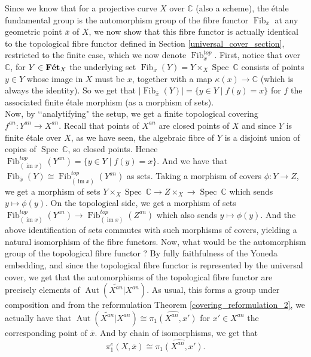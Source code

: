 \documentclass{article}
\theoremstyle{plain}
\theoremstyle{definition}
\DeclareMathOperator{\Fib}{Fib}
\DeclareMathOperator{\Aut}{Aut}
\DeclareMathOperator{\Spec}{Spec}
\DeclareMathOperator{\im}{im}
\DeclareMathOperator{\Fet}{\bf{F\acute{e}t}}
\begin{document}
\noindent Since we know that for a projective curve $X$ over $\mathbb{C}$ (also a scheme), the \'etale fundamental group is the automorphism group of the fibre functor $\Fib_{\overline{x}}$ at any geometric point $\overline{x}$ of $X$,
we now show that this fibre functor is actually identical to the topological fibre functor defined in Section \ref{universal_cover_section}, restricted to the finite case, which we now denote $\Fib^{top}_x$.
First, notice that over $\mathbb{C}$, for $Y\in \Fet_X$ the underlying set $\Fib_{\overline{x}}(Y) = Y\times_X\Spec\:\mathbb{C}$ consists of points $y\in Y$ whose image in $X$ must be $x$, together with a map $\kappa(x)\rightarrow \mathbb{C}$ (which is always the identity).
So we get that $|\Fib_{\overline{x}}(Y)| = \{y\in Y \mid f(y)=x\}$ for $f$ the associated finite \'etale morphism (as a morphism of sets). \\
Now, by ‘‘analytifying" the setup, we get a finite topological covering $f^{an}:Y^{an}\rightarrow X^{an}$.
Recall that points of $X^{an}$ are closed points of $X$ and since $Y$ is finite \'etale over $X$, as we have seen, the algebraic fibre of $Y$ is a disjoint union of copies of $\Spec\:\mathbb{C}$, so closed points.
Hence $\Fib^{top}_{(\im x)}(Y^{an}) = \{y\in Y \mid f(y)=x\}$. 
And we have that $\Fib_{\overline{x}}(Y) \cong \Fib^{top}_{(\im x)}(Y^{an})$ as sets.
Taking a morphism of covers $\phi:Y\rightarrow Z$, we get a morphism of sets $Y\times_X\Spec\:\mathbb{C} \rightarrow Z\times_X\rightarrow\Spec\:\mathbb{C}$ which sends $y\mapsto \phi(y)$. On the topological side, we get a morphism of sets $\Fib^{top}_{(\im x)}(Y^{an})\rightarrow \Fib^{top}_{(\im x)} (Z^{an})$ which also sends $y\mapsto \phi(y)$.
And the above identification of sets commutes with such morphisms of covers, yielding a natural isomorphism of the fibre functors.
Now, what would be the automorphism group of the topological fibre functor ?
By fully faithfulness of the Yoneda embedding, and since the topological fibre functor is represented by the universal cover, we get that the automorphisms of the topological fibre functor are precisely elements of $\Aut(\widetilde{X^{an}}|X^{an})$.
As usual, this forms a group under composition and from the reformulation Theorem \ref{covering_reformulation_2}, we actually have that $\Aut(\widetilde{X^{an}}|X^{an}) \cong \widehat{\pi_1(X^{an},x')}$ for $x'\in X^{an}$ the corresponding point of $\overline{x}$. And by chain of isomorphisms, we get that 
$$\pi^e_1(X,\overline{x}) \cong \widehat{\pi_1(X^{an},x')}.$$
\end{document}
